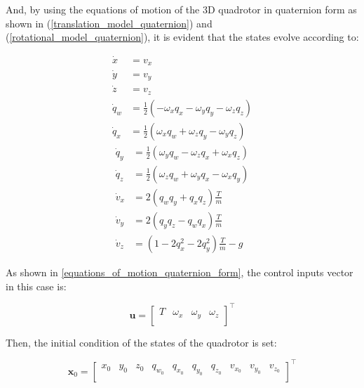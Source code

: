 \documentclass{thesisreport}
\begin{document}
And, by using the equations of motion of the 3D quadrotor in quaternion form as shown in (\ref{translation_model_quaternion}) and (\ref{rotational_model_quaternion}), it is evident that the states evolve according to: 

\begin{multicols}{2}
            \begin{align}
                \dot{x} &= v_x \\
                \dot{y} &= v_y \\
                \dot{z} &= v_z \\
                \dot{q}_w &=\frac{1}{2}( - \omega_x q_x - \omega_y q_y - \omega_z q_z) \\
                \dot{q}_x &=\frac{1}{2}( \omega_x q_w + \omega_z q_y - \omega_y q_z)
            \end{align}
        \columnbreak
            \begin{align}
                \dot{q}_y &=\frac{1}{2}( \omega_y q_w - \omega_z q_x + \omega_x q_z) \\
                \dot{q}_z &=\frac{1}{2}( \omega_z q_w + \omega_y q_x - \omega_x q_y) \\
                \dot{v}_x &= 2( q_w q_y + q_x q_z )\frac{T}{m} \\
                \dot{v}_y &= 2(q_y q_z - q_w q_x )\frac{T}{m} \\
                \dot{v}_z &= ( 1 - 2 q_x^2 - 2 q_y^2 )\frac{T}{m} - g
            \end{align}
\end{multicols}

As shown in \ref{equations_of_motion_quaternion_form}, the control inputs vector in this case is: 

\begin{equation}
	\bm{u} = \begin{bmatrix}
		T & \omega_x & \omega_y & \omega_z \\
	\end{bmatrix}^{\intercal}
\end{equation}

Then, the initial condition of the states of the quadrotor is set:

\begin{equation}
	\bm{x}_0 = \begin{bmatrix}
		x_0 & y_0 & z_0 & q_{w_0} & q_{x_0} & q_{y_0} & q_{z_0} & v_{x_0} & v_{y_0} & v_{z_0}\\
	\end{bmatrix}^{\intercal}
\end{equation}
\end{document}
